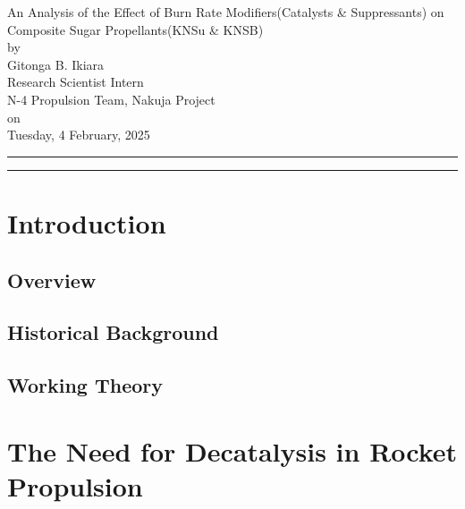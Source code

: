 \documentclass[12pt,letterpaper]{article}
\begin{document}
	\begin{center}
		\huge{An Analysis of the Effect of Burn Rate Modifiers(Catalysts \& Suppressants) on Composite Sugar Propellants(KNSu \& KNSB)} \\
		by 																\\
		\Large{Gitonga B. Ikiara} 													\\
		\large{Research Scientist Intern} 												\\
		\large{N-4 Propulsion Team, Nakuja Project} 											\\
		on 																\\
		\large{Tuesday, 4 February, 2025} 												\\
	\end{center}

	\rule{\textwidth}{0.5pt}
	\begin{abstract}
		\noindent\lipsum[1-1]
	\end{abstract}
	\rule{\textwidth}{0.5pt}

	\section{Introduction}
		\subsection{Overview}
        		\lipsum[1-2]
        	\subsection{Historical Background}
                	\lipsum[1-3]
		\subsection{Working Theory}
			\lipsum[1-2]\cite{Nakka:2001}

	\section{The Need for Decatalysis in Rocket Propulsion}
\end{document}
